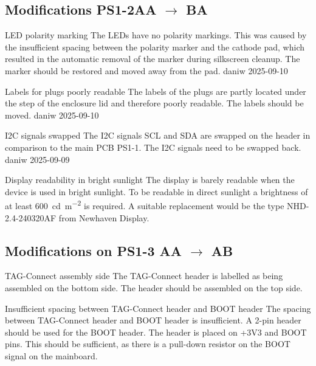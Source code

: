 \FloatBarrier

\subsection{Modifications PS1-2AA $\to$ BA}

\begin{ModTable}

\ModItemDone
{LED polarity marking}
{The LEDs have no polarity markings. This was caused by the insufficient spacing between the polarity marker and the cathode pad, which resulted in the automatic removal of the marker during silkscreen cleanup. }
{The marker should be restored and moved away from the pad. }
{daniw}
{2025-09-10}

\ModItemDone
{Labels for plugs poorly readable}
{The labels of the plugs are partly located under the step of the enclosure lid and therefore poorly readable. }
{The labels should be moved. }
{daniw}
{2025-09-10}

\ModItemDone
{\acs{I2C} signals swapped}
{The \ac{I2C} signals SCL and SDA are swapped on the header in comparison to the main PCB PS1-1. }
{The \ac{I2C} signals need to be swapped back. }
{daniw}
{2025-09-09}

\ModItemOpen
{Display readability in bright sunlight}
{The display is barely readable when the device is used in bright sunlight. }
{To be readable in direct sunlight a brightness of at least \qty{600}{\candela\per\square\meter} is required. A suitable replacement would be the type NHD-2.4-240320AF from Newhaven Display. }
{}
{}

\end{ModTable}

\FloatBarrier

\subsection{Modifications on PS1-3 AA $\to$ AB}

\begin{ModTable}

\ModItemOpen
{TAG-Connect assembly side}
{The TAG-Connect header is labelled as being assembled on the bottom side. }
{The header should be assembled on the top side. }
{}
{}

\ModItemOpen
{Insufficient spacing between TAG-Connect header and BOOT header}
{The spacing between TAG-Connect header and BOOT header is insufficient. }
{A 2-pin header should be used for the BOOT header. The header is placed on +3V3 and BOOT pins. This should be sufficient, as there is a pull-down resistor on the BOOT signal on the mainboard. }
{}
{}

\end{ModTable}

